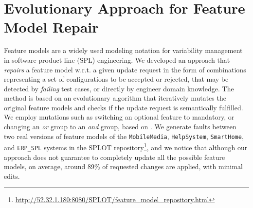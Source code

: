 \documentclass[
12pt, %
oneside, %
english, %
singlespacing, %
headsepline, %
consistentlayout, %
]{MastersDoctoralThesis} %
\theoremstyle{plain}
\theoremstyle{definition}
\theoremstyle{remark}
\theoremstyle{remark}
\theoremstyle{plain}
\theoremstyle{plain}
\theoremstyle{remark}
\begin{document}


\chapter{Evolutionary Approach for Feature Model Repair}
Feature models are a widely used modeling notation for variability management in software product line (SPL) engineering. 
We developed an approach that \textit{repairs} a feature model w.r.t. a given update request in the form of combinations representing a set of configurations to be accepted or rejected, that may be detected by \textit{failing} test cases, or directly by engineer domain knowledge. %
The method is based on an evolutionary algorithm that iteratively mutates the original feature models and checks if the update request is semantically fulfilled.
We employ mutations such as switching an optional feature to mandatory, or changing an \emph{or} group to an \emph{and} group, based on \cite{arcaini2018evolutionary}.
We generate faults between two real versions of feature models of the {\tt MobileMedia}, {\tt HelpSystem},  {\tt SmartHome}, and {\tt ERP\_SPL} systems in the SPLOT repository\footnote{\url{http://52.32.1.180:8080/SPLOT/feature_model_repository.html}}, and we notice that although our approach does not guarantee to completely update all the possible feature models, on average, around 89\% of requested changes are applied, with minimal edits.%
\end{document}
